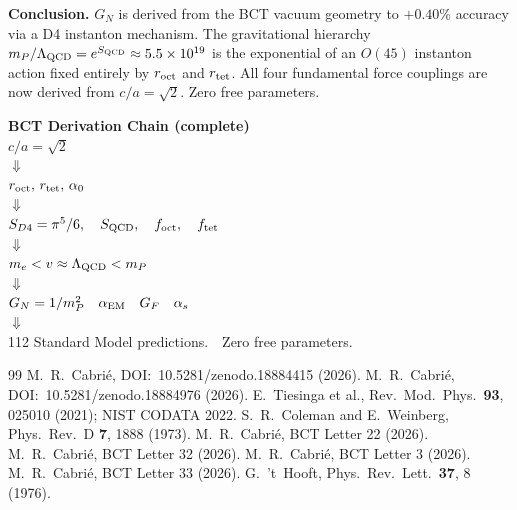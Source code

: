 \documentclass[aps,prl,twocolumn,superscriptaddress,floatfix]{revtex4-2}
\begin{document}
\medskip
\noindent\textbf{Conclusion.}
$G_N$ is derived from the BCT vacuum geometry to $+0.40\%$ accuracy via
a D4 instanton mechanism. The gravitational hierarchy
$m_P/\Lambda_{\rm QCD} = e^{S_{\rm QCD}} \approx 5.5\times10^{19}$
is the exponential of an $O(45)$ instanton action fixed entirely by
$r_{\rm oct}$ and $r_{\rm tet}$. All four fundamental force couplings
are now derived from $c/a = \sqrt{2}$. Zero free parameters.

\bigskip
\begin{center}
\begin{small}
\textbf{BCT Derivation Chain (complete)}\\[4pt]
$c/a = \sqrt{2}$\\
$\Downarrow$\\
$r_{\rm oct},\, r_{\rm tet},\, \alpha_0$\\
$\Downarrow$\\
$S_{D4} = \pi^5/6,\quad S_{\rm QCD},\quad f_{\rm oct},\quad f_{\rm tet}$\\
$\Downarrow$\\
$m_e < v \approx \Lambda_{\rm QCD} < m_P$\\
$\Downarrow$\\
$G_N = 1/m_P^2 \quad \alpha_{\rm EM} \quad G_F \quad \alpha_s$\\
$\Downarrow$\\
112 Standard Model predictions.\ \ Zero free parameters.
\end{small}
\end{center}

\begin{thebibliography}{99}
 M.~R.~Cabri\'e,
  DOI:~10.5281/zenodo.18884415 (2026).
 M.~R.~Cabri\'e,
  DOI:~10.5281/zenodo.18884976 (2026).
 E.~Tiesinga et al., Rev.\ Mod.\ Phys.\ \textbf{93}, 025010 (2021);
  NIST CODATA 2022.
 S.~R.~Coleman and E.~Weinberg,
  Phys.\ Rev.\ D \textbf{7}, 1888 (1973).
 M.~R.~Cabri\'e, BCT Letter 22 (2026).
 M.~R.~Cabri\'e, BCT Letter 32 (2026).
 M.~R.~Cabri\'e, BCT Letter 3 (2026).
 M.~R.~Cabri\'e, BCT Letter 33 (2026).
 G.~'t~Hooft, Phys.\ Rev.\ Lett.\ \textbf{37}, 8 (1976).
\end{thebibliography}
\end{document}
